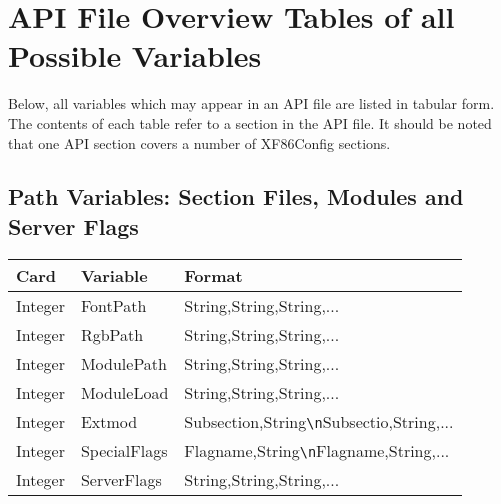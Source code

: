 \section{API File Overview Tables of all Possible Variables}
Below, all variables which may appear in an API file are listed in tabular
form. The contents of each table refer to a section in the API file. It should
be noted that one API section covers a number of XF86Config sections.

\subsection{Path Variables: Section Files, Modules and Server Flags}
\begin{tabular}[h]{|p{2cm}|p{4cm}|p{7cm}|}
 \hline
 \textbf{Card} & \textbf{Variable}     & \textbf{Format}                \\
 \hline
 Integer & FontPath     & String,String,String,...                       \\
 Integer & RgbPath      & String,String,String,...                       \\ 
 Integer & ModulePath   & String,String,String,...                       \\
 Integer & ModuleLoad   & String,String,String,...                       \\
 Integer & Extmod       & Subsection,String\verb+\n+Subsectio,String,... \\ 
 Integer & SpecialFlags & Flagname,String\verb+\n+Flagname,String,...    \\
 Integer & ServerFlags  & String,String,String,...                       \\
 \hline
\end{tabular}

